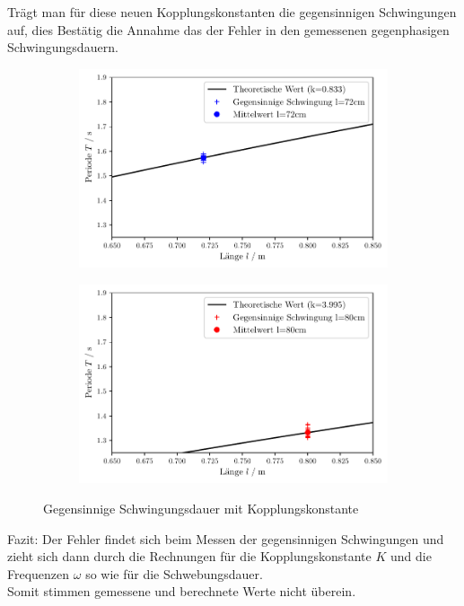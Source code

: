 Trägt man für diese neuen Kopplungskonstanten die gegensinnigen Schwingungen auf, dies Bestätig die Annahme
das der Fehler in den gemessenen gegenphasigen Schwingungsdauern.  
\begin{figure}
    \begin{subfigure}[c]{0.5\textwidth}
        \includegraphics[width=\textwidth]{plots/plot4.pdf}
    \end{subfigure}
    \begin{subfigure}[c]{0.5\textwidth}
        \includegraphics[width=\textwidth]{plots/plot5.pdf}
        \label{subfig:gegenNEU80}
    \end{subfigure}
    \caption{Gegensinnige Schwingungsdauer mit Kopplungskonstante}
\end{figure}

Fazit: Der Fehler findet sich beim Messen der gegensinnigen Schwingungen und
zieht sich dann durch die Rechnungen für die Kopplungskonstante $K$ und die Frequenzen $\omega$
so wie für die Schwebungsdauer.\\
Somit stimmen gemessene und berechnete Werte nicht überein.


